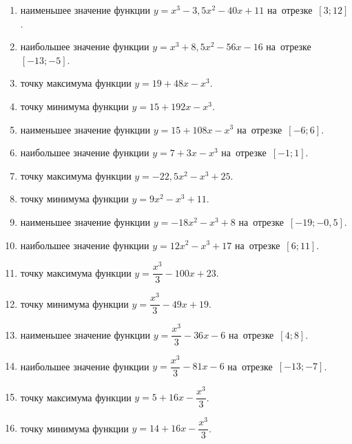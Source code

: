 \documentclass[a4paper,10pt]{article}
\begin{document}
\begin{enumerate}
\item {} наименьшее значение функции $y=x^3 -3,5x^2-40x+11$ на~отрезке~$\left[3;12\right]$.

\item {} наибольшее значение функции $y=x^3 +8,5x^2-56x-16$ на~отрезке~$\left[-13;-5\right]$.

\item {} точку максимума функции $y=19+48x-x^3$.

\item {} точку минимума функции $y=15+192x-x^3$.

\item {} наименьшее значение функции $y=15+108x-x^3$ на~отрезке~$\left[-6;6\right]$.

\item {} наибольшее значение функции $y=7+3x-x^3$ на~отрезке~$\left[-1;1\right]$.

\item {} точку максимума функции $y=-22,5x^2-x^3+25$.

\item {} точку минимума функции $y=9x^2-x^3+11$.

\item {} наименьшее значение функции $y=-18x^2-x^3+8$ на~отрезке~$\left[-19;-0,5\right]$.

\item {} наибольшее значение функции $y=12x^2-x^3+17$ на~отрезке~$\left[6;11\right]$.

\item {} точку максимума функции $y=\dfrac{x^3}{3} -100x+23$.

\item {} точку минимума функции $y=\dfrac{x^3}{3} -49x+19$.

\item {} наименьшее значение функции $y=\dfrac{x^3}{3} -36x-6$ на~отрезке~$\left[4;8\right]$.

\item {} наибольшее значение функции $y=\dfrac{x^3}{3} -81x-6$ на~отрезке~$\left[-13;-7\right]$.

\item {} точку максимума функции $y=5 +16x-\dfrac{x^3}{3}$.

\item {} точку минимума функции $y=14 +16x-\dfrac{x^3}{3}$.


\end{enumerate}
\end{document}
